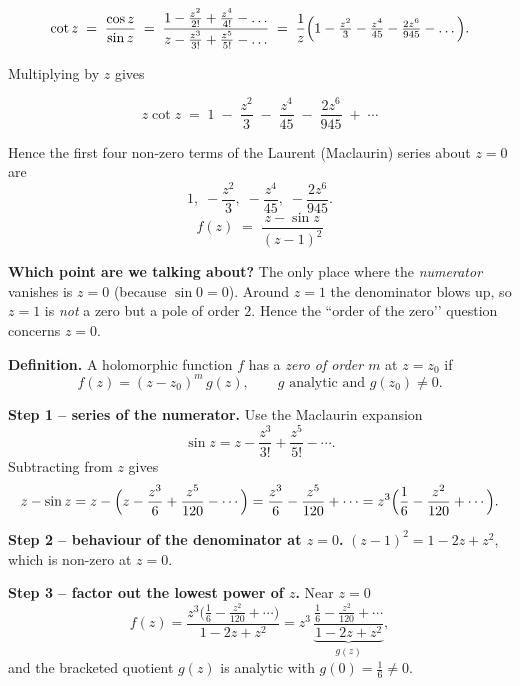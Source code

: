 \documentclass[12pt]{article}
\title{}
\author{Jerich Lee}
\date{\today}
\theoremstyle{definition} %
\theoremstyle{plain} %
\begin{document}
\maketitle

\[
\cot z \;=\; \frac{\cos z}{\sin z}
           \;=\; \frac{1-\frac{z^{2}}{2!}+\frac{z^{4}}{4!}-\dots}
                     {z-\frac{z^{3}}{3!}+\frac{z^{5}}{5!}-\dots}
           \;=\; \frac{1}{z}
                 \Bigl(1-\tfrac{z^{2}}{3}-\tfrac{z^{4}}{45}
                       -\tfrac{2z^{6}}{945}-\dots\Bigr).
\]

Multiplying by \(z\) gives

\[
\boxed{\;
   z\cot z
     \;=\;
     1 \;-\;\frac{z^{2}}{3}
        \;-\;\frac{z^{4}}{45}
        \;-\;\frac{2z^{6}}{945}
        \;+\;\cdots
   \;}
\]

Hence the first four non-zero terms of the Laurent
(Maclaurin) series about \(z=0\) are
\[
1,\; -\dfrac{z^{2}}{3},\; -\dfrac{z^{4}}{45},
   \; -\dfrac{2z^{6}}{945}.
\]
\[
f(z)\;=\;\frac{z-\sin z}{(z-1)^{2}}
\]

\textbf{Which point are we talking about?}  
The only place where the \emph{numerator} vanishes is \(z=0\) (because
\(\sin 0=0\)).  Around \(z=1\) the denominator blows up, so
\(z=1\) is \emph{not} a zero but a pole of order \(2\).
Hence the “order of the zero’’ question concerns \(z=0\).

\bigskip
\textbf{Definition.}  
A holomorphic function \(f\) has a \emph{zero of order \(m\)} at
\(z=z_{0}\) if
\[
f(z)= (z-z_{0})^{m}\,g(z),
\qquad g \text{ analytic and } g(z_{0})\neq0 .
\]

\bigskip
\textbf{Step 1 – series of the numerator.}
Use the Maclaurin expansion
\[
\sin z = z-\frac{z^{3}}{3!}+\frac{z^{5}}{5!}-\cdots .
\]
Subtracting from \(z\) gives
\[
z-\sin z
   = z-\Bigl(z-\frac{z^{3}}{6}+\frac{z^{5}}{120}-\cdots\Bigr)
   = \frac{z^{3}}{6}-\frac{z^{5}}{120}+\cdots
   = z^{3}\Bigl(\frac16-\frac{z^{2}}{120}+\cdots\Bigr).
\]

\textbf{Step 2 – behaviour of the denominator at \(z=0\).}
\((z-1)^{2}=1-2z+z^{2}\), which is non-zero at \(z=0\).

\textbf{Step 3 – factor out the lowest power of \(z\).}
Near \(z=0\)
\[
f(z)=
\frac{z^{3}\bigl(\tfrac16-\tfrac{z^{2}}{120}+\cdots\bigr)}
     {1-2z+z^{2}}
     = z^{3}\,\underbrace{\frac{\tfrac16-\tfrac{z^{2}}{120}+\cdots}
                               {1-2z+z^{2}}}_{g(z)},
\]
and the bracketed quotient \(g(z)\) is analytic with
\(g(0)=\tfrac16\neq0\).
\end{document}
